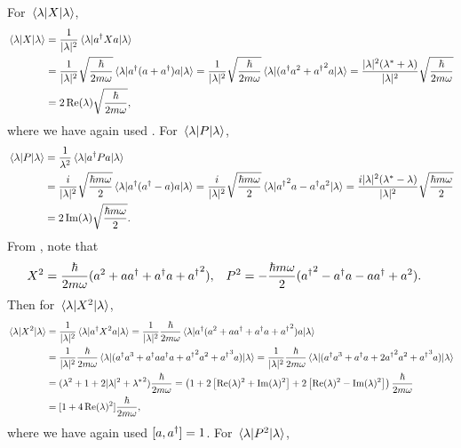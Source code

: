 \begin{solution}
	For $\ev{X}{\lam}$,
	\begin{align}
		\ev{X}{\lam} &= \frac{1}{|\lam|^2} \ev{\ad X a}{\lam} \notag \\
		&= \frac{1}{|\lam|^2} \sqrt{\frac{\hbar}{2 m \omega}} \ev{\ad (a + \ad) a}{\lam}
		= \frac{1}{|\lam|^2} \sqrt{\frac{\hbar}{2 m \omega}} \ev{(\ad a^2 + {\ad}^2 a}{\lam}
		= \frac{|\lam|^2 (\lam^* + \lam)}{|\lam|^2} \sqrt{\frac{\hbar}{2 m \omega}} \notag \\
		&= 2 \Re(\lam) \sqrt{\frac{\hbar}{2 m \omega}}, \label{evX}
	\end{align}
	where we have again used .  For $\ev{P}{\lam}$,
	\begin{align}
		\ev{P}{\lam} &= \frac{1}{\lambda^2} \ev{\ad P a}{\lam} \notag \\
		&= \frac{i}{|\lam|^2} \sqrt{\frac{\hbar m \omega}{2}} \ev{\ad(\ad - a)a}{\lam} = \frac{i}{|\lam|^2} \sqrt{\frac{\hbar m \omega}{2}} \ev{{\ad}^2 a - \ad a^2}{\lam}
		= \frac{i |\lam|^2 (\lam^* - \lam)}{|\lam|^2} \sqrt{\frac{\hbar m \omega}{2}} \notag \\
		&= 2 \Im(\lam) \sqrt{\frac{\hbar m \omega}{2}}. \label{evP}
	\end{align}
	From , note that
	\begin{align*}
		X^2 &= \frac{\hbar}{2 m \omega} (a^2 + a a^\dagger + a^\dagger a + {a^\dagger}^2), &
		P^2 &= -\frac{\hbar m \omega}{2} ({a^\dagger}^2 - a^\dagger a - a a^\dagger + a^2).
	\end{align*}
	Then for $\ev{X^2}{\lam}$,
	\begin{align}
		\ev{X^2}{\lam} &= \frac{1}{|\lam|^2} \ev{\ad X^2 a}{\lam}
		= \frac{1}{|\lam|^2} \frac{\hbar}{2 m \omega} \ev{\ad (a^2 + a \ad + \ad a + {\ad}^2) a}{\lam} \notag \\
		&= \frac{1}{|\lam|^2} \frac{\hbar}{2 m \omega} \ev{(\ad a^3 + \ad a \ad a + {\ad}^2 a^2 + {\ad}^3 a)}{\lam}
		= \frac{1}{|\lam|^2} \frac{\hbar}{2 m \omega} \ev{(\ad a^3 + \ad a + 2 {\ad}^2 a^2 + {\ad}^3 a)}{\lam} \notag \\
		&= (\lam^2 + 1 + 2 |\lam|^2 + {\lam^*}^2) \frac{\hbar}{2 m \omega}
		= \left( 1 + 2 \left[ \Re(\lam)^2 + \Im(\lam)^2 \right] + 2 \left[ \Re(\lam)^2 - \Im(\lam)^2 \right] \right) \frac{\hbar}{2 m \omega} \notag \\
		&= [1 + 4 \Re(\lam)^2 ] \frac{\hbar}{2 m \omega} \label{evXsq},
	\end{align}
	where we have again used $[a, a^\dagger] = 1$.  For $\ev{P^2}{\lam}$,
	\begin{align}

\end{align}
\end{solution}
